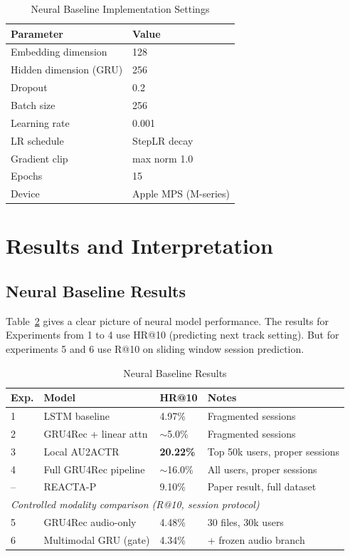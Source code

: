 \documentclass[conference]{IEEEtran}
\begin{document}
\begin{table}[t]
\caption{Neural Baseline Implementation Settings}
\label{tab:setup}
\centering
\footnotesize
\begin{tabular}{ll}
\toprule
Parameter & Value \\
\midrule
Embedding dimension & 128 \\
Hidden dimension (GRU) & 256 \\
Dropout & 0.2 \\
Batch size & 256 \\
Learning rate & 0.001 \\
LR schedule & StepLR decay \\
Gradient clip & max norm 1.0 \\
Epochs & 15 \\
Device & Apple MPS (M-series) \\
\bottomrule
\end{tabular}
\end{table}

\section{Results and Interpretation}

\subsection{Neural Baseline Results}

Table~\ref{tab:neural} gives a clear picture of neural model performance. The
results for Experiments from 1 to 4 use HR@10 (predicting next track setting).
But for experiments 5 and 6 use R@10 on sliding window session prediction.

\begin{table}[t]
\caption{Neural Baseline Results}
\label{tab:neural}
\centering
\footnotesize
\begin{tabular}{llll}
\toprule
Exp. & Model & HR@10 & Notes \\
\midrule
1 & LSTM baseline         & 4.97\%  & Fragmented sessions \\
2 & GRU4Rec + linear attn & $\sim$5.0\% & Fragmented sessions \\
3 & Local AU2ACTR         & \textbf{20.22\%} & Top 50k users, proper sessions \\
4 & Full GRU4Rec pipeline & $\sim$16.0\% & All users, proper sessions \\
-- & REACTA-P \cite{tran2025reacta} & 9.10\% & Paper result, full dataset \\
\midrule
\multicolumn{4}{l}{\textit{Controlled modality comparison (R@10, session protocol)}} \\
\midrule
5 & GRU4Rec audio-only    & 4.48\%  & 30 files, 30k users \\
6 & Multimodal GRU (gate) & 4.34\%  & + frozen audio branch \\
\bottomrule
\end{tabular}
\end{table}
\end{document}
